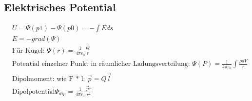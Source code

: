 \subsection*{Elektrisches Potential}
\begin{align*}
    & U = \Psi(p1) - \Psi(p0) = -\int E ds\\
    & E = -grad(\Psi)\\
    & \text{Für Kugel: } \Psi(r) = \frac{1}{4 \pi \varepsilon_0} \frac{Q}{r}\\
    & \text{Potential einzelner Punkt in räumlicher Ladungsverteilung: } \Psi(P) = \frac{1}{4 \pi \varepsilon_0} \int \frac{\rho dV}{r}\\
    & \text{Dipolmoment: wie F * l: } \overrightarrow{p} = Q \overrightarrow{l}\\
    & \text{Dipolpotential} \Psi_{dip} = \frac{1}{4 \pi \varepsilon_0} \frac{\overrightarrow{p} \hat{r}}{r^2}\\
\end{align*}